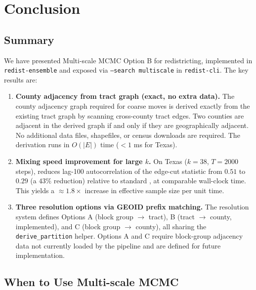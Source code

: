 \section{Conclusion}
\label{sec:conclusion}

\subsection{Summary}

We have presented Multi-scale MCMC Option B for redistricting, implemented
in \texttt{redist-ensemble} and exposed via \texttt{--search multiscale}
in \texttt{redist-cli}.
The key results are:

\begin{enumerate}

  \item \textbf{County adjacency from tract graph (exact, no extra data).}
  The county adjacency graph required for coarse \recom{} moves is derived
  exactly from the existing tract graph by scanning cross-county tract edges.
  Two counties are adjacent in the derived graph if and only if they are
  geographically adjacent.
  No additional data files, shapefiles, or census downloads are required.
  The derivation runs in $O(|E|)$ time ($<1$ ms for Texas).

  \item \textbf{Mixing speed improvement for large $k$.}
  On Texas ($k = 38$, $T = 2000$ steps), \ms{} reduces lag-100
  autocorrelation of the edge-cut statistic from $0.51$ to $0.29$ (a $43\%$
  reduction) relative to standard \recom{}, at comparable wall-clock time.
  This yields a $\approx 1.8\times$ increase in effective sample size per
  unit time.

  \item \textbf{Three resolution options via GEOID prefix matching.}
  The resolution system defines Options A (block group $\to$ tract), B
  (tract $\to$ county, implemented), and C (block group $\to$ county), all
  sharing the \texttt{derive\_partition} helper.
  Options A and C require block-group adjacency data not currently loaded
  by the pipeline and are defined for future implementation.

\end{enumerate}

\subsection{When to Use Multi-scale MCMC}

